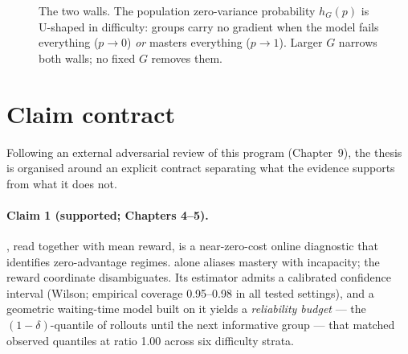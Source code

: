 \begin{figure}[t]
\centering
{}
\caption{The two walls. The population zero-variance probability
$h_G(p)$ is U-shaped in difficulty: groups carry no gradient when the model
fails everything ($p\to0$) \emph{or} masters everything ($p\to1$). Larger $G$
narrows both walls; no fixed $G$ removes them.}
\label{fig:ushape}
\end{figure}

\section{Claim contract}
\label{sec:claims}
Following an external adversarial review of this program (Chapter~9), the
thesis is organised around an explicit contract separating what the evidence
supports from what it does not.

\paragraph{Claim 1 (supported; Chapters 4--5).} \ZVF{}, read together with
mean reward, is a near-zero-cost online diagnostic that identifies
zero-advantage regimes. \ZVF{} alone aliases mastery with incapacity; the
reward coordinate disambiguates. Its estimator admits a calibrated confidence
interval (Wilson; empirical coverage 0.95--0.98 in all tested settings), and a
geometric waiting-time model built on it yields a \emph{reliability budget} ---
the $(1{-}\delta)$-quantile of rollouts until the next informative group ---
that matched observed quantiles at ratio 1.00 across six difficulty strata.

